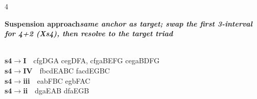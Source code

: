 \documentclass[letterpaper,12pt]{article}
\begin{document}
\begin{multicols}{4}
\noindent\colorbox{hdr5}{\begin{minipage}{\dimexpr\linewidth-2\fboxsep\relax}\raggedright\color{white}\bfseries Suspension approach\quad\normalfont\itshape same anchor as target; swap the first 3-interval for 4+2 (Xs4), then resolve to the target triad\end{minipage}}\\[0.1mm]
\noindent\hangindent=0.25in {\color{lhcol}\bfseries s4$\to$I}~~{\ttfamily cfgDGA cegDFA, cfgaBEFG cegaBDFG}\\[0.1mm]
\noindent\hangindent=0.25in {\color{lhcol}\bfseries s4$\to$IV}~~{\ttfamily fbcdEABC facdEGBC}\\[0.1mm]
\noindent\hangindent=0.25in {\color{lhcol}\bfseries s4$\to$iii}~~{\ttfamily eabFBC egbFAC}\\[0.1mm]
\noindent\hangindent=0.25in {\color{lhcol}\bfseries s4$\to$ii}~~{\ttfamily dgaEAB dfaEGB}\\[0.1mm]
\vspace{1.5mm}


\end{multicols}
\end{document}
